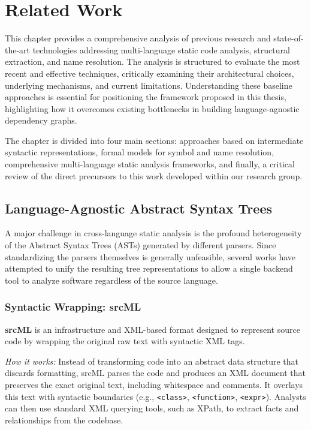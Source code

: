\chapter{Related Work}
\label{ch:related_work}

This chapter provides a comprehensive analysis of previous research
and state-of-the-art technologies addressing multi-language static
code analysis, structural extraction, and name resolution. The
analysis is structured to evaluate the most recent and effective
techniques, critically examining their architectural choices,
underlying mechanisms, and current limitations. Understanding these
baseline approaches is essential for positioning the framework
proposed in this thesis, highlighting how it overcomes existing
bottlenecks in building language-agnostic dependency graphs.

The chapter is divided into four main sections: approaches based on
intermediate syntactic representations, formal models for symbol and
name resolution, comprehensive multi-language static analysis
frameworks, and finally, a critical review of the direct precursors
to this work developed within our research group.

\section{Language-Agnostic Abstract Syntax Trees}

A major challenge in cross-language static analysis is the profound
heterogeneity of the Abstract Syntax Trees (ASTs) generated by
different parsers. Since standardizing the parsers themselves is
generally unfeasible, several works have attempted to unify the
resulting tree representations to allow a single backend tool to
analyze software regardless of the source language.

\subsection{Syntactic Wrapping: srcML}

\textbf{srcML} \cite{collard_srcml_2016} is an infrastructure and
XML-based format designed to represent source code by wrapping the
original raw text with syntactic XML tags.

\textit{How it works:} Instead of transforming code into an abstract
data structure that discards formatting, srcML parses the code and
produces an XML document that preserves the exact original text,
including whitespace and comments. It overlays this text with
syntactic boundaries (e.g., \texttt{<class>}, \texttt{<function>},
\texttt{<expr>}). Analysts can then use standard XML querying tools,
such as XPath, to extract facts and relationships from the codebase.

